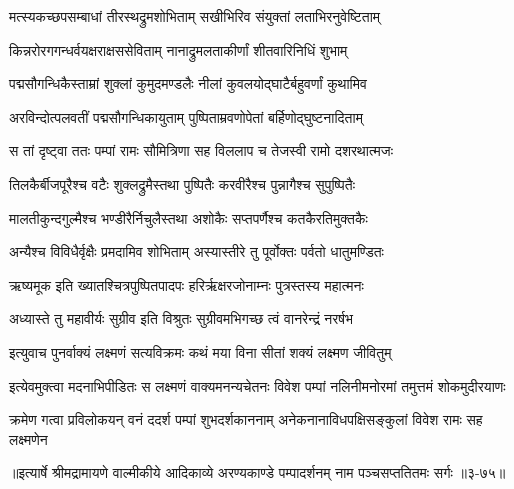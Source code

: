 \twolineshloka
{मत्स्यकच्छपसम्बाधां तीरस्थद्रुमशोभिताम्}
{सखीभिरिव संयुक्तां लताभिरनुवेष्टिताम्} %

\twolineshloka
{किन्नरोरगगन्धर्वयक्षराक्षससेविताम्}
{नानाद्रुमलताकीर्णां शीतवारिनिधिं शुभाम्} %

\twolineshloka
{पद्मसौगन्धिकैस्ताम्रां शुक्लां कुमुदमण्डलैः}
{नीलां कुवलयोद्घाटैर्बहुवर्णां कुथामिव} %

\twolineshloka
{अरविन्दोत्पलवतीं पद्मसौगन्धिकायुताम्}
{पुष्पिताम्रवणोपेतां बर्हिणोद्घुष्टनादिताम्} %

\twolineshloka
{स तां दृष्ट्वा ततः पम्पां रामः सौमित्रिणा सह}
{विललाप च तेजस्वी रामो दशरथात्मजः} %

\twolineshloka
{तिलकैर्बीजपूरैश्च वटैः शुक्लद्रुमैस्तथा}
{पुष्पितैः करवीरैश्च पुन्नागैश्च सुपुष्पितैः} %

\twolineshloka
{मालतीकुन्दगुल्मैश्च भण्डीरैर्निचुलैस्तथा}
{अशोकैः सप्तपर्णैश्च कतकैरतिमुक्तकैः} %

\twolineshloka
{अन्यैश्च विविधैर्वृक्षैः प्रमदामिव शोभिताम्}
{अस्यास्तीरे तु पूर्वोक्तः पर्वतो धातुमण्डितः} %

\twolineshloka
{ऋष्यमूक इति ख्यातश्चित्रपुष्पितपादपः}
{हरिर्ऋक्षरजोनाम्नः पुत्रस्तस्य महात्मनः} %

\twolineshloka
{अध्यास्ते तु महावीर्यः सुग्रीव इति विश्रुतः}
{सुग्रीवमभिगच्छ त्वं वानरेन्द्रं नरर्षभ} %

\twolineshloka
{इत्युवाच पुनर्वाक्यं लक्ष्मणं सत्यविक्रमः}
{कथं मया विना सीतां शक्यं लक्ष्मण जीवितुम्} %

\twolineshloka
{इत्येवमुक्त्वा मदनाभिपीडितः स लक्ष्मणं वाक्यमनन्यचेतनः}
{विवेश पम्पां नलिनीमनोरमां तमुत्तमं शोकमुदीरयाणः} %

\twolineshloka
{क्रमेण गत्वा प्रविलोकयन् वनं ददर्श पम्पां शुभदर्शकाननाम्}
{अनेकनानाविधपक्षिसङ्कुलां विवेश रामः सह लक्ष्मणेन} %


॥इत्यार्षे श्रीमद्रामायणे वाल्मीकीये आदिकाव्ये अरण्यकाण्डे पम्पादर्शनम् नाम पञ्चसप्ततितमः सर्गः ॥३-७५॥
